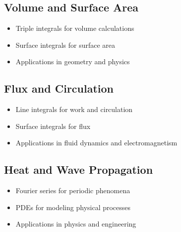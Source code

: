 \documentclass[11pt]{article}
\theoremstyle{definition}
\begin{document}
\subsection{Volume and Surface Area}
\begin{itemize}
    \item Triple integrals for volume calculations
    \item Surface integrals for surface area
    \item Applications in geometry and physics
\end{itemize}

\subsection{Flux and Circulation}
\begin{itemize}
    \item Line integrals for work and circulation
    \item Surface integrals for flux
    \item Applications in fluid dynamics and electromagnetism
\end{itemize}

\subsection{Heat and Wave Propagation}
\begin{itemize}
    \item Fourier series for periodic phenomena
    \item PDEs for modeling physical processes
    \item Applications in physics and engineering
\end{itemize}
\end{document}
